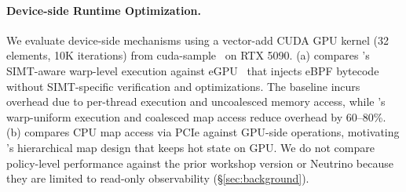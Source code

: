 \paragraph{Device-side Runtime Optimization.}
We evaluate device-side \sys mechanisms using a vector-add CUDA GPU kernel (32 elements, 10K iterations) from cuda-sample~\cite{nvidia_cuda_samples} on RTX 5090.
(a) compares \sys's SIMT-aware warp-level execution against eGPU~\cite{egpu} that injects eBPF bytecode without SIMT-specific verification and optimizations.
The baseline incurs overhead due to per-thread execution and uncoalesced memory access, while \sys's warp-uniform execution and coalesced map access reduce overhead by 60--80\%.
(b) compares CPU map access via PCIe against GPU-side operations, motivating \sys's hierarchical map design that keeps hot state on GPU.
We do not compare policy-level performance against the prior workshop version or Neutrino because they are limited to read-only observability (\S\ref{sec:background}). %
